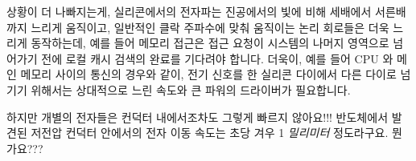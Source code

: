 상황이 더 나빠지는게, 실리콘에서의 전자파는 진공에서의 빛에 비해 세배에서
서른배까지 느리게 움직이고, 일반적인 클락 주파수에 맞춰 움직이는 논리 회로들은
더욱 느리게 동작하는데, 예를 들어 메모리 접근은 접근 요청이 시스템의 나머지
영역으로 넘어가기 전에 로컬 캐시 검색의 완료를 기다려야 합니다.
더욱이, 예를 들어 CPU 와 메인 메모리 사이의 통신의 경우와 같이, 전기 신호를 한
실리콘 다이에서 다른 다이로 넘기기 위해서는 상대적으로 느린 속도와 큰 파워의
드라이버가 필요합니다.
\iffalse

To make matters even worse, electric waves in silicon move from three to
thirty times more slowly than does light in a vacuum, and common
clocked logic constructs run still more slowly, for example, a
memory reference may need to wait for a local cache lookup to complete
before the request may be passed on to the rest of the system.
Furthermore, relatively low speed and high power drivers are required
to move electrical signals from one silicon die to another, for example,
to communicate between a CPU and main memory.
\fi

\QuickQuiz{}
	하지만 개별의 전자들은 컨덕터 내에서조차도 그렇게 빠르지 않아요!!!
	반도체에서 발견된 저전압 컨덕터 안에서의 전자 이동 속도는 초당 겨우 1
	\emph{밀리미터} 정도라구요.
	뭔가요???
	\iffalse

